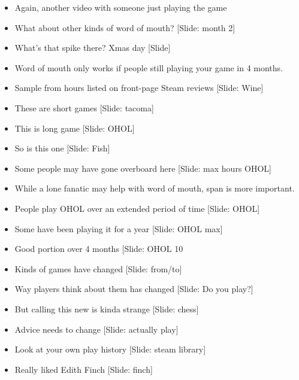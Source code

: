 \documentclass[12pt]{article}
\begin{document}
{\begin{itemize}
\item Again, another video with someone just playing the game

\item What about other kinds of word of mouth? [Slide:  month 2]

\item What's that spike there?  Xmas day [Slide]

\item Word of mouth only works if people still playing your game in 4 months.

\item Sample from hours listed on front-page Steam reviews [Slide: Wine]

\item These are short games [Slide: tacoma]

\item This is long game [Slide: OHOL]

\item So is this one [Slide: Fish]

\item Some people may have gone overboard here [Slide: max hours OHOL]

\item While a lone fanatic may help with word of mouth, span is more important.

\item People play OHOL over an extended period of time [Slide: OHOL]

\item Some have been playing it for a year [Slide: OHOL max]

\item Good portion over 4 months [Slide: OHOL 10%

\item Kinds of games have changed [Slide: from/to]

\item Way players think about them has changed [Slide:  Do you play?]

\item But calling this new is kinda strange [Slide:  chess]

\item Advice needs to change [Slide: actually play]

\item Look at your own play history [Slide: steam library]

\item Really liked Edith Finch [Slide: finch]


\end{itemize}}
\end{document}
